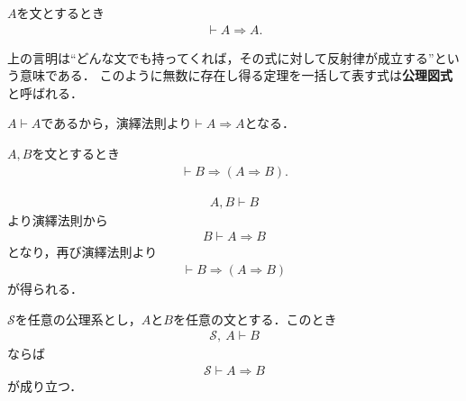 	\begin{screen}
		\begin{logicalthm}[含意の反射律]\label{logicalthm:reflective_law_of_implication}
			$A$を文とするとき
			\begin{align}
				\vdash A \Longrightarrow A.
			\end{align}
		\end{logicalthm}
	\end{screen}
	
	上の言明は``どんな文でも持ってくれば，その式に対して反射律が成立する''という意味である．
	このように無数に存在し得る定理を一括して表す式は{\bf 公理図式}と呼ばれる．
	
	\begin{prf}
		$A \vdash A$であるから，演繹法則より$\vdash A \Longrightarrow A$となる．
		\QED
	\end{prf}
	
	\begin{screen}
		\begin{logicalthm}[正しい式は仮定を選ばない]\label{logicalthm:rule_of_inference_2}
			$A,B$を文とするとき
			\begin{align}
				\vdash B \Longrightarrow (A \Longrightarrow B).
			\end{align}
		\end{logicalthm}
	\end{screen}
	
	\begin{prf}
		\begin{align}
			A,B \vdash B
		\end{align}
		より演繹法則から
		\begin{align}
			B \vdash A \Longrightarrow B
		\end{align}
		となり，再び演繹法則より
		\begin{align}
			\vdash B \Longrightarrow (A \Longrightarrow B)
		\end{align}
		が得られる．
		\QED
	\end{prf}
	
	\begin{screen}
		\begin{metathm}[演繹法則]
			$\mathscr{S}$を任意の公理系とし，$A$と$B$を任意の文とする．このとき
			\begin{align}
				\mathscr{S},\ A \vdash B
			\end{align}
			ならば
			\begin{align}
				\mathscr{S} \vdash A \Longrightarrow B
			\end{align}
			が成り立つ．
		\end{metathm}
	\end{screen}
	
